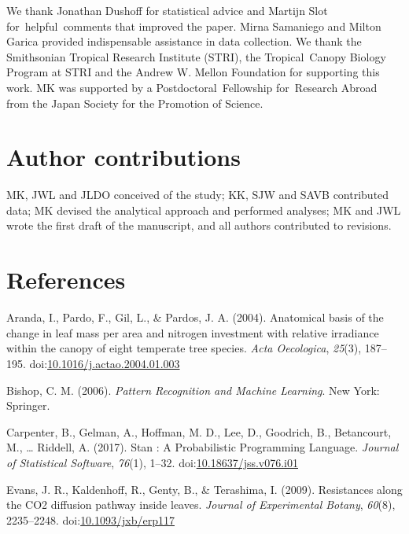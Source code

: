 \documentclass[12pt,]{article}
\theoremstyle{definition}
\theoremstyle{definition}
\theoremstyle{definition}
\theoremstyle{remark}
\begin{document}
We thank Jonathan Dushoff for statistical advice and Martijn Slot
for~helpful~comments that improved the paper. Mirna Samaniego and Milton
Garica provided indispensable assistance in data collection. We thank
the Smithsonian Tropical Research Institute (STRI), the Tropical~Canopy
Biology Program at STRI and the Andrew W. Mellon Foundation for
supporting this work. MK was supported by a Postdoctoral~Fellowship
for~Research Abroad from the Japan Society for the Promotion of Science.

\hypertarget{author-contributions}{%
\section{Author contributions}\label{author-contributions}}

MK, JWL and JLDO conceived of the study; KK, SJW and SAVB contributed
data; MK devised the analytical approach and performed analyses; MK and
JWL wrote the first draft of the manuscript, and all authors contributed
to revisions.

\hypertarget{references}{%
\section{References}\label{references}}

\hypertarget{refs}{}
\leavevmode\hypertarget{ref-Aranda2004}{}%
Aranda, I., Pardo, F., Gil, L., \& Pardos, J. A. (2004). Anatomical
basis of the change in leaf mass per area and nitrogen investment with
relative irradiance within the canopy of eight temperate tree species.
\emph{Acta Oecologica}, \emph{25}(3), 187--195.
doi:\href{https://doi.org/10.1016/j.actao.2004.01.003}{10.1016/j.actao.2004.01.003}

\leavevmode\hypertarget{ref-Bishop2006}{}%
Bishop, C. M. (2006). \emph{Pattern Recognition and Machine Learning}.
New York: Springer.

\leavevmode\hypertarget{ref-Carpenter2017}{}%
Carpenter, B., Gelman, A., Hoffman, M. D., Lee, D., Goodrich, B.,
Betancourt, M., \ldots{} Riddell, A. (2017). Stan : A Probabilistic
Programming Language. \emph{Journal of Statistical Software},
\emph{76}(1), 1--32.
doi:\href{https://doi.org/10.18637/jss.v076.i01}{10.18637/jss.v076.i01}

\leavevmode\hypertarget{ref-Evans2009}{}%
Evans, J. R., Kaldenhoff, R., Genty, B., \& Terashima, I. (2009).
Resistances along the CO2 diffusion pathway inside leaves. \emph{Journal
of Experimental Botany}, \emph{60}(8), 2235--2248.
doi:\href{https://doi.org/10.1093/jxb/erp117}{10.1093/jxb/erp117}
\end{document}
